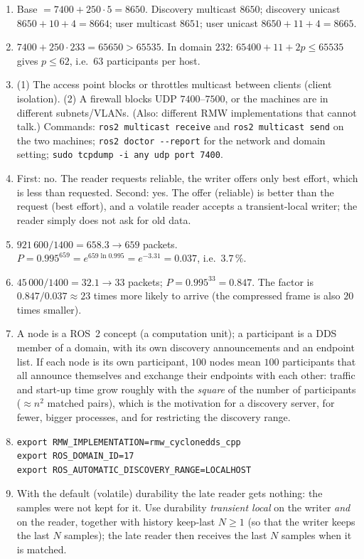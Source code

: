 \begin{enumerate}[label=\textbf{\ansnum.\arabic*}]
  \item Base $=7400+250\cdot5=8650$. Discovery multicast $8650$; discovery unicast $8650+10+4=8664$; user multicast $8651$; user unicast $8650+11+4=8665$.
  \item $7400+250\cdot233=65650>65535$. In domain $232$: $65400+11+2p\le65535$ gives $p\le62$, i.e.\ $63$ participants per host.
  \item (1) The access point blocks or throttles multicast between clients (client isolation). (2) A firewall blocks UDP $7400$--$7500$, or the machines are in different subnets/VLANs. (Also: different RMW implementations that cannot talk.) Commands: \verb!ros2 multicast receive! and \verb!ros2 multicast send! on the two machines; \verb!ros2 doctor --report! for the network and domain setting; \verb!sudo tcpdump -i any udp port 7400!.
  \item First: no. The reader requests reliable, the writer offers only best effort, which is less than requested. Second: yes. The offer (reliable) is better than the request (best effort), and a volatile reader accepts a transient-local writer; the reader simply does not ask for old data.
  \item $921\,600/1400=658.3\to659$ packets. $P=0.995^{659}=e^{659\ln0.995}=e^{-3.31}=0.037$, i.e.\ $3.7\,\%$.
  \item $45\,000/1400=32.1\to33$ packets; $P=0.995^{33}=0.847$. The factor is $0.847/0.037\approx23$ times more likely to arrive (the compressed frame is also $20$ times smaller).
  \item A node is a ROS~2 concept (a computation unit); a participant is a DDS member of a domain, with its own discovery announcements and an endpoint list. If each node is its own participant, $100$ nodes mean $100$ participants that all announce themselves and exchange their endpoints with each other: traffic and start-up time grow roughly with the \emph{square} of the number of participants ($\approx n^2$ matched pairs), which is the motivation for a discovery server, for fewer, bigger processes, and for restricting the discovery range.
  \item \begin{verbatim}
export RMW_IMPLEMENTATION=rmw_cyclonedds_cpp
export ROS_DOMAIN_ID=17
export ROS_AUTOMATIC_DISCOVERY_RANGE=LOCALHOST
\end{verbatim}
  \item With the default (volatile) durability the late reader gets nothing: the samples were not kept for it. Use durability \emph{transient local} on the writer \emph{and} on the reader, together with history keep-last $N\ge1$ (so that the writer keeps the last $N$ samples); the late reader then receives the last $N$ samples when it is matched.

\end{enumerate}
